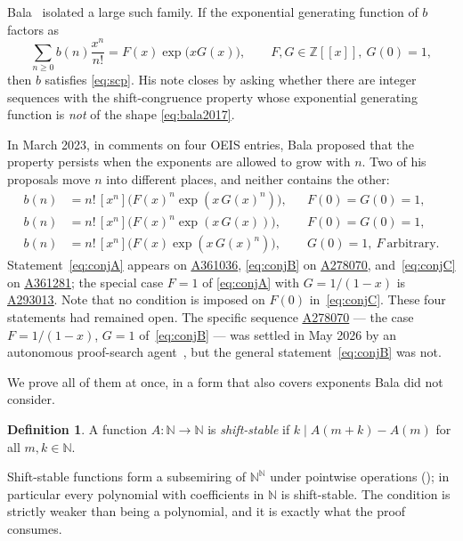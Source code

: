 \documentclass[11pt,a4paper]{article}
\theoremstyle{plain}
\theoremstyle{definition}
\newtheorem{definition}[theorem]{Definition}
\newcommand{\N}{\mathbb{N}}
\newcommand{\Z}{\mathbb{Z}}
\newcommand{\coeff}[1]{[x^{#1}]}
\newcommand{\oeis}[1]{\href{https://oeis.org/#1}{\underline{#1}}}
\begin{document}
Bala~\cite{bala2017} isolated a large such family. If the exponential generating function
of $b$ factors as
\begin{equation}\label{eq:bala2017}
  \sum_{n\ge0}b(n)\frac{x^n}{n!}=F(x)\exp\big(xG(x)\big),
  \qquad F,G\in\Z[[x]],\ G(0)=1,
\end{equation}
then $b$ satisfies \eqref{eq:scp}. His note closes by asking whether there are integer
sequences with the shift-congruence property whose exponential generating function is
\emph{not} of the shape \eqref{eq:bala2017}.

In March 2023, in comments on four OEIS entries, Bala proposed that the property persists
when the exponents are allowed to grow with $n$. Two of his proposals move $n$ into
different places, and neither contains the other:
\begin{align}
  b(n)&=n!\,\coeff{n}\big(F(x)^{n}\exp(x\,G(x)^{n})\big),
        &&F(0)=G(0)=1, \label{eq:conjA}\\
  b(n)&=n!\,\coeff{n}\big(F(x)^{n}\exp(x\,G(x))\big),
        &&F(0)=G(0)=1, \label{eq:conjB}\\
  b(n)&=n!\,\coeff{n}\big(F(x)\exp(x\,G(x)^{n})\big),
        &&G(0)=1,\ F\ \text{arbitrary}. \label{eq:conjC}
\end{align}
Statement~\eqref{eq:conjA} appears on \oeis{A361036}, \eqref{eq:conjB} on \oeis{A278070},
and~\eqref{eq:conjC} on \oeis{A361281}; the special case $F=1$ of \eqref{eq:conjA} with
$G=1/(1-x)$ is \oeis{A293013}. Note that no condition is imposed on $F(0)$
in~\eqref{eq:conjC}. These four statements had remained open. The specific sequence
\oeis{A278070} --- the case $F=1/(1-x)$, $G=1$ of~\eqref{eq:conjB} --- was settled in May
2026 by an autonomous proof-search agent~\cite{adamczewski2026}, but the general
statement~\eqref{eq:conjB} was not.

We prove all of them at once, in a form that also covers exponents Bala did not consider.

\begin{definition}\label{def:ss}
A function $A\colon\N\to\N$ is \emph{shift-stable} if $k\mid A(m+k)-A(m)$ for all
$m,k\in\N$.
\end{definition}

Shift-stable functions form a subsemiring of $\N^\N$ under pointwise operations
(); in particular every polynomial with coefficients in $\N$ is
shift-stable. The condition is strictly weaker than being a polynomial, and it is exactly
what the proof consumes.
\end{document}
